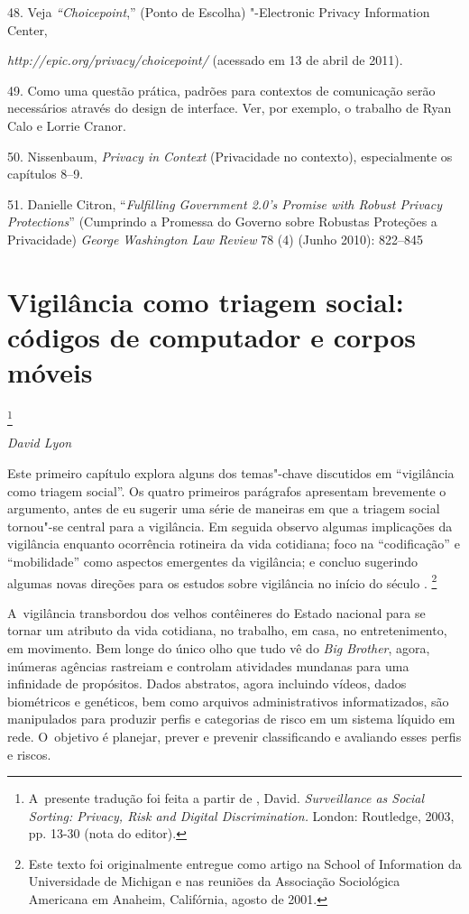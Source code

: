 \begin{Parskip}
48. Veja \emph{``Choicepoint},'' (Ponto de Escolha) "-Electronic
Privacy Information Center,

\emph{http://epic.org/privacy/choicepoint/}
(acessado em 13 de abril de 2011).

49. Como uma questão prática, padrões para contextos de comunicação serão
necessários através do design de interface. Ver, por exemplo, o trabalho
de Ryan Calo e Lorrie Cranor.

50. Nissenbaum, \emph{Privacy in Context} (Privacidade no contexto),
especialmente os capítulos 8--9.

51. Danielle Citron, ``\emph{Fulfilling Government 2.0's Promise with
Robust Privacy Protections}'' (Cumprindo a Promessa do Governo sobre
Robustas Proteções a Privacidade) \emph{George Washington Law Review} 78
(4) (Junho 2010): 822--845
\end{Parskip}

\chapter{Vigilância como triagem social: códigos de computador e corpos
móveis}\footnote{A~presente tradução foi feita a partir de , David.
  \emph{Surveillance as Social Sorting: Privacy, Risk and Digital
  Discrimination.} London: Routledge, 2003, pp. 13-30 (nota do editor).}

\begin{flushright}
\emph{David Lyon}
\end{flushright}

Este primeiro capítulo explora alguns dos temas"-chave discutidos em
``vigilância como triagem social''. Os quatro primeiros parágrafos
apresentam brevemente o argumento, antes de eu sugerir uma série de
maneiras em que a triagem social tornou"-se central para a vigilância. Em
seguida observo algumas implicações da vigilância enquanto ocorrência
rotineira da vida cotidiana; foco na ``codificação'' e ``mobilidade''
como aspectos emergentes da vigilância; e concluo sugerindo algumas
novas direções para os estudos sobre vigilância no início do século .
\footnote{Este texto foi originalmente entregue como artigo na School of
  Information da Universidade de Michigan e nas reuniões da Associação
  Sociológica Americana em Anaheim, Califórnia, agosto de 2001.}

A~vigilância transbordou dos velhos contêineres do Estado nacional para
se tornar um atributo da vida cotidiana, no trabalho, em casa, no
entretenimento, em movimento. Bem longe do único olho que tudo vê do
\emph{Big Brother}, agora, inúmeras agências rastreiam e controlam
atividades mundanas para uma infinidade de propósitos. Dados abstratos,
agora incluindo vídeos, dados biométricos e genéticos, bem como arquivos
administrativos informatizados, são manipulados para produzir perfis e
categorias de risco em um sistema líquido em rede. O~objetivo é
planejar, prever e prevenir classificando e avaliando esses perfis e
riscos.

